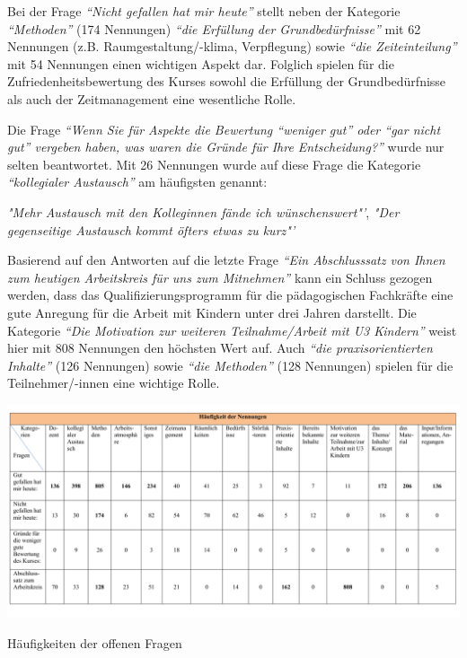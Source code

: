 \documentclass[12pt,a4paper]{article}
\begin{document}
Bei der Frage \textit{"`Nicht gefallen hat mir heute"'} stellt neben der Kategorie \textit{"`Methoden"' }(174 Nennungen)\textit{ "`die Erfüllung der Grundbedürfnisse"'} mit 62 Nennungen (z.B. Raumgestaltung/-klima, Verpflegung) sowie \textit{"`die Zeiteinteilung"'} mit 54 Nennungen einen wichtigen Aspekt dar. Folglich spielen für die Zufriedenheitsbewertung des Kurses sowohl die Erfüllung der Grundbedürfnisse als auch der Zeitmanagement eine wesentliche Rolle. 

Die Frage \textit{"`Wenn Sie für Aspekte die Bewertung "`weniger gut"' oder "`gar nicht gut"' vergeben haben, was waren die Gründe für Ihre Entscheidung?"'} wurde nur selten beantwortet. Mit 26 Nennungen wurde auf diese Frage die Kategorie \textit{"`kollegialer Austausch"'} am häufigsten genannt:

\textit{ "Mehr Austausch mit den Kolleginnen fände ich wünschenswert"'},
\textit{ "Der gegenseitige Austausch kommt öfters etwas zu kurz"'}

Basierend auf den Antworten auf die letzte Frage \textit{"`Ein Abschlusssatz von Ihnen zum heutigen Arbeitskreis für uns zum Mitnehmen"'} kann ein Schluss gezogen werden, dass das Qualifizierungsprogramm für die pädagogischen Fachkräfte eine gute Anregung für die Arbeit mit Kindern unter drei Jahren darstellt. Die Kategorie \textit{"`Die Motivation zur weiteren Teilnahme/Arbeit mit U3 Kindern"'} weist hier mit 808 Nennungen den höchsten Wert auf. Auch \textit{"`die praxisorientierten Inhalte"'} (126 Nennungen) sowie \textit{"`die Methoden"'} (128 Nennungen) spielen für die Teilnehmer/-innen eine wichtige Rolle. 
\begin{center}
\begin{table}[!ht]
\includegraphics[scale=0.71,angle=90]{tab04.pdf}
\caption{Häufigkeiten der offenen Fragen}
\label{tab.9}
\end{table}
\end{center}
\end{document}
